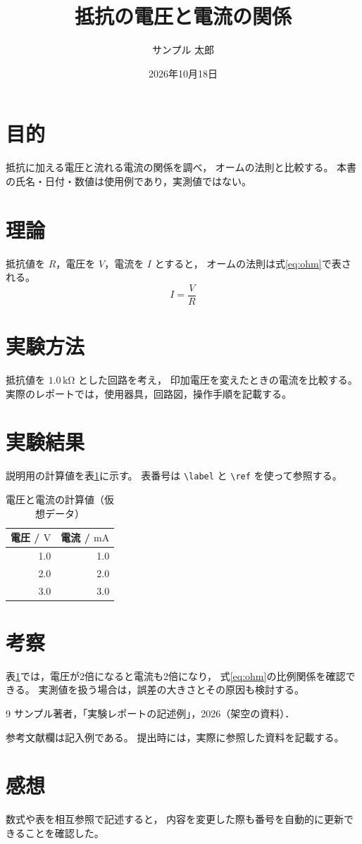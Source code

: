 \documentclass[platex,dvipdfmx,titlepage,a4j]{jsarticle}
\title{抵抗の電圧と電流の関係}
\author{サンプル 太郎}
\date{2026年10月18日}
\begin{document}
\maketitle

\section{目的}
抵抗に加える電圧と流れる電流の関係を調べ，
オームの法則と比較する。
本書の氏名・日付・数値は使用例であり，実測値ではない。

\section{理論}
抵抗値を \(R\)，電圧を \(V\)，電流を \(I\) とすると，
オームの法則は式\eqref{eq:ohm}で表される。
\begin{equation}
  I = \frac{V}{R}
  \label{eq:ohm}
\end{equation}

\section{実験方法}
抵抗値を \(1.0\,\mathrm{k\Omega}\) とした回路を考え，
印加電圧を変えたときの電流を比較する。
実際のレポートでは，使用器具，回路図，操作手順を記載する。

\section{実験結果}
説明用の計算値を表\ref{tab:values}に示す。
表番号は \verb|\label| と \verb|\ref| を使って参照する。
\begin{table}[htbp]
  \centering
  \caption{電圧と電流の計算値（仮想データ）}
  \label{tab:values}
  \begin{tabular}{rr}
    \hline
    電圧 / \(\mathrm{V}\) & 電流 / \(\mathrm{mA}\) \\
    \hline
    1.0 & 1.0 \\
    2.0 & 2.0 \\
    3.0 & 3.0 \\
    \hline
  \end{tabular}
\end{table}

\section{考察}
表\ref{tab:values}では，電圧が2倍になると電流も2倍になり，
式\eqref{eq:ohm}の比例関係を確認できる。
実測値を扱う場合は，誤差の大きさとその原因も検討する。

\begin{thebibliography}{9}
    サンプル著者，「実験レポートの記述例」，2026（架空の資料）．
\end{thebibliography}
参考文献欄は記入例である。
提出時には，実際に参照した資料を記載する。

\section*{感想}
数式や表を相互参照で記述すると，
内容を変更した際も番号を自動的に更新できることを確認した。
\end{document}
